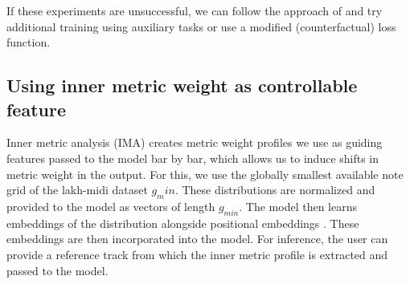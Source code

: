If these experiments are unsuccessful, we can follow the approach of \cite{Shu_Xu_Musebarcontrol_2024} and try additional training using auxiliary tasks or use a modified (counterfactual) loss function. 

\subsection{Using inner metric weight as controllable feature}
Inner metric analysis (IMA) creates metric weight profiles we use as guiding features passed to the model bar by bar, which allows us to induce shifts in metric weight in the output. 
For this, we use the globally smallest available note grid of the lakh-midi dataset $g_min$. These distributions are normalized and provided to the model as vectors of length $g_{min}$.
The model then learns embeddings of the distribution alongside positional embeddings \cite{Lin_cocomulla_2024}. These embeddings are then incorporated into the model. For inference, the user can provide a reference track from which the inner metric profile is extracted and passed to the model. 
